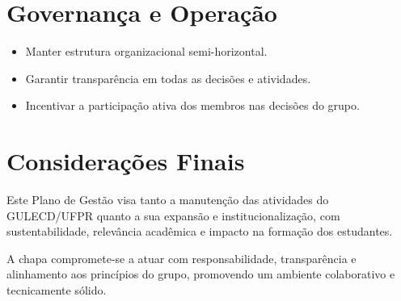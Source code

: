 \documentclass[11pt,a4paper]{article}
\begin{document}
\section{Governança e Operação}

\begin{itemize}
    \item Manter estrutura organizacional semi-horizontal.
    \item Garantir transparência em todas as decisões e atividades.
    \item Incentivar a participação ativa dos membros nas decisões do grupo.
\end{itemize}

\section{Considerações Finais}

Este Plano de Gestão visa tanto a manutenção das atividades do GULECD/UFPR quanto a sua expansão e institucionalização, com sustentabilidade, relevância acadêmica e impacto na formação dos estudantes.

A chapa compromete-se a atuar com responsabilidade, transparência e alinhamento aos princípios do grupo, promovendo um ambiente colaborativo e tecnicamente sólido.
\end{document}
